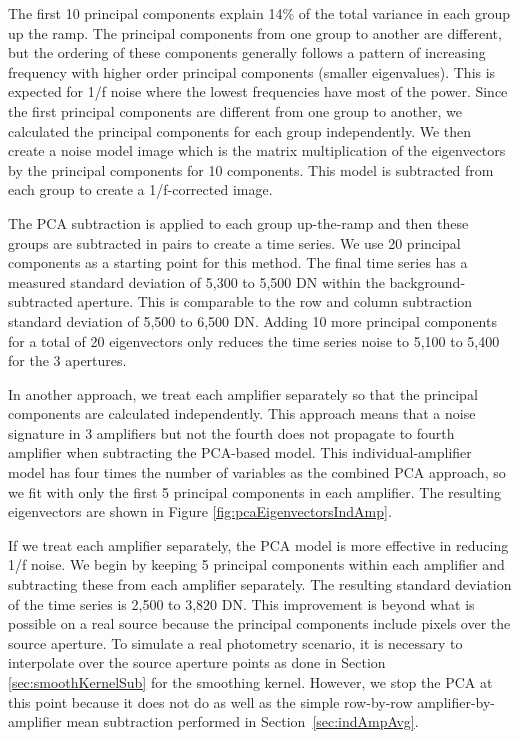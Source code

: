 \documentclass[]{aastex62}
\begin{document}
The first 10 principal components explain 14\% of the total variance in each group up the ramp.
The principal components from one group to another are different, but the ordering of these components generally follows a pattern of increasing frequency with higher order principal components (smaller eigenvalues).
This is expected for 1/f noise where the lowest frequencies have most of the power.
Since the first principal components are different from one group to another, we calculated the principal components for each group independently.
We then create a noise model image which is the matrix multiplication of the eigenvectors by the principal components for 10 components.
This model is subtracted from each group to create a 1/f-corrected image.

The PCA subtraction is applied to each group up-the-ramp and then these groups are subtracted in pairs to create a time series.
We use 20 principal components as a starting point for this method.
The final time series has a measured standard deviation of 5,300 to 5,500 DN within the background-subtracted aperture.
This is comparable to the row and column subtraction standard deviation of 5,500 to 6,500 DN.
Adding 10 more principal components for a total of 20 eigenvectors only reduces the time series noise to 5,100 to 5,400 for the 3 apertures.

In another approach, we treat each amplifier separately so that the principal components are calculated independently.
This approach means that a noise signature in 3 amplifiers but not the fourth does not propagate to fourth amplifier when subtracting the PCA-based model.
This individual-amplifier model has four times the number of variables as the combined PCA approach, so we fit with only the first 5 principal components in each amplifier.
The resulting eigenvectors are shown in Figure \ref{fig:pcaEigenvectorsIndAmp}.

If we treat each amplifier separately, the PCA model is more effective in reducing 1/f noise.
We begin by keeping 5 principal components within each amplifier and subtracting these from each amplifier separately.
The resulting standard deviation of the time series is 2,500 to 3,820 DN.
This improvement is beyond what is possible on a real source because the principal components include pixels over the source aperture.
To simulate a real photometry scenario, it is necessary to interpolate over the source aperture points as done in Section \ref{sec:smoothKernelSub} for the smoothing kernel.
However, we stop the PCA at this point because it does not do as well as the simple row-by-row amplifier-by-amplifier mean subtraction performed in Section~\ref{sec:indAmpAvg}.
\end{document}
